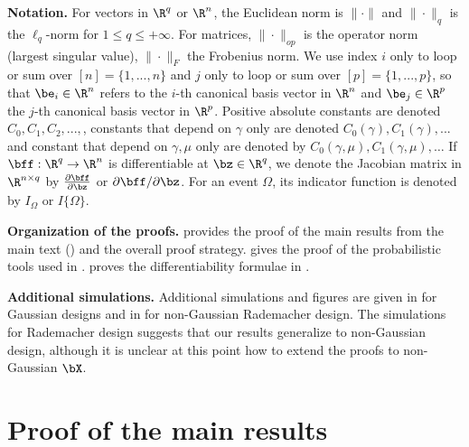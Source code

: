 \documentclass{colt2022} %
\numberwithin{equation}{section}
\begin{document}
\textbf{Notation.}
For vectors in $\R^q$ or $\R^n$,
the Euclidean norm is $\|\cdot\|$
and $\|\cdot\|_q$ is the $\ell_q$-norm for $1\le q \le +\infty$.
For matrices, $\|\cdot\|_{op}$ is the operator norm (largest singular value),
$\|\cdot\|_F$ the Frobenius norm.
We use index $i$ only to loop or sum over $[n] =\{1,...,n\}$
and $j$ only to loop or sum over $[p]=\{1,...,p\}$,
so that $\be_i\in\R^n$ refers to the $i$-th
canonical basis vector in $\R^n$ and $\be_j\in\R^p$ 
the $j$-th canonical basis vector in $\R^p$.
Positive absolute constants are denoted $C_0, C_1, C_2,...,$,
constants that depend on $\gamma$ only are denoted $C_0(\gamma),C_1(\gamma),...$ and constant that depend on $\gamma,\mu$ only are denoted
by $C_0(\gamma,\mu), C_1(\gamma,\mu),\dots$
If $\bff:\R^q\to\R^n$ is differentiable at $\bz\in\R^q$,
we denote the Jacobian matrix in $\R^{n\times q}$ by
$\frac{\partial\bff}{\partial \bz}$
or $\partial\bff/\partial \bz$.
For an event $\Omega$, its indicator function is denoted by
$I_\Omega$ or $I\{\Omega\}$.

\textbf{Organization of the proofs.}
 provides the proof of the main results from the main text
()
and the overall proof strategy.
 gives the proof of the probabilistic tools used
in .
 proves the differentiability formulae in
.

\textbf{Additional simulations.}
Additional simulations and figures are given in 
for Gaussian designs and in  for non-Gaussian 
Rademacher design. The simulations for Rademacher design suggests that
our results generalize to non-Gaussian design, although 
it is unclear at this point how to extend the proofs to non-Gaussian $\bX$.

\section{Proof of the main results}
\label{sec:7}
\end{document}
